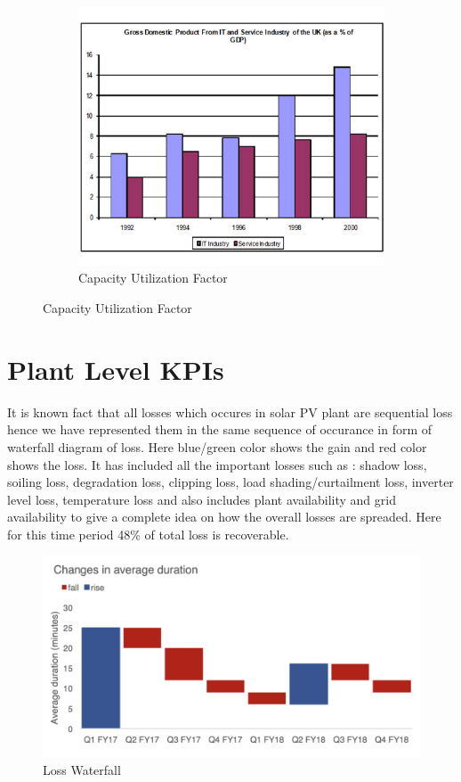 \documentclass[18pt]{article}
\begin{document}
\begin{figure}
\begin{subfigure}[b]{0.3\textwidth}
	\centering
	\includegraphics[width=\textwidth]{figures/sample1.jpeg}
	\caption{Capacity Utilization Factor}
	\label{fig:y equals x}
\end{subfigure}


\end{figure}


\section{Plant Level KPIs}

It is known fact that all losses which occures in solar PV plant are sequential loss hence we have represented them in the same sequence of occurance in form of waterfall diagram of loss. Here blue/green color shows the gain and red color shows the loss. It has included all the important losses such as : shadow loss, soiling loss, degradation loss, clipping loss, load shading/curtailment loss, inverter level loss, temperature loss and also includes plant availability and grid availability to give a complete idea on how the overall losses are spreaded. Here for this time period 48\% of total loss is recoverable. 

\begin{figure}
	\centering
	\includegraphics[width=12cm]{figures/loss_waterfall.png}
	\caption{Loss Waterfall}
	\label{fig: lw}
\end{figure}
\end{document}
